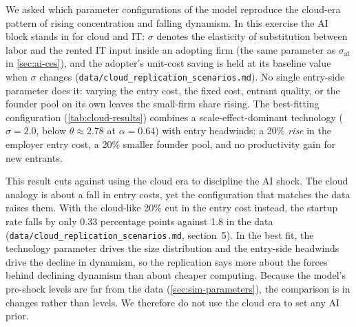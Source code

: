 We asked which parameter configurations of the model reproduce the cloud-era pattern of rising concentration and falling dynamism.
In this exercise the AI block stands in for cloud and IT: $\sigma$ denotes the elasticity of substitution between labor and the rented IT input inside an adopting firm (the same parameter as $\sigma_{\text{ai}}$ in \cref{sec:ai-ces}), and the adopter's unit-cost saving is held at its baseline value when $\sigma$ changes (\texttt{data/cloud\_replication\_scenarios.md}).
No single entry-side parameter does it: varying the entry cost, the fixed cost, entrant quality, or the founder pool on its own leaves the small-firm share rising.
The best-fitting configuration (\cref{tab:cloud-results}) combines a scale-effect-dominant technology ($\sigma = 2.0$, below $\theta \approx 2.78$ at $\alpha = 0.64$) with entry headwinds: a 20\% \emph{rise} in the employer entry cost, a 20\% smaller founder pool, and no productivity gain for new entrants.

This result cuts against using the cloud era to discipline the AI shock.
The cloud analogy is about a fall in entry costs, yet the configuration that matches the data raises them.
With the cloud-like 20\% cut in the entry cost instead, the startup rate falls by only 0.33 percentage points against 1.8 in the data (\texttt{data/cloud\_replication\_scenarios.md}, section~5).
In the best fit, the technology parameter drives the size distribution and the entry-side headwinds drive the decline in dynamism, so the replication says more about the forces behind declining dynamism \citep{akcigit2021ten,karahan2024demographic} than about cheaper computing.
Because the model's pre-shock levels are far from the data (\cref{sec:sim-parameters}), the comparison is in changes rather than levels.
We therefore do not use the cloud era to set any AI prior.

